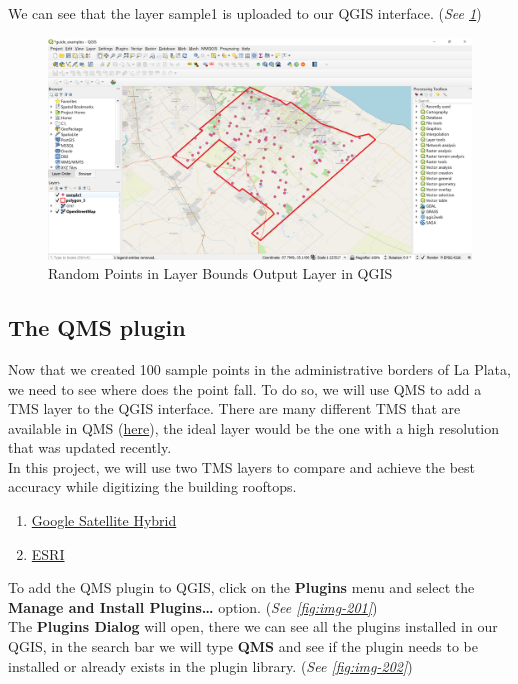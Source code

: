 \documentclass[
]{book}
\providecommand{\tightlist}{%
  \setlength{\itemsep}{0pt}\setlength{\parskip}{0pt}}
\begin{document}
We can see that the layer {sample1} is uploaded to our QGIS interface. (\emph{See \ref{fig:img-200}})

\begin{figure}

{\centering \includegraphics[width=1\linewidth]{images/spatialpoints3} 

}

\caption{Random Points in Layer Bounds Output Layer in QGIS}\label{fig:img-200}
\end{figure}

\hypertarget{the-qms-plugin}{%
\subsection{The QMS plugin}\label{the-qms-plugin}}

Now that we created 100 sample points in the administrative borders of La Plata, we need to see where does the point fall. To do so, we will use QMS to add a TMS layer to the QGIS interface.
There are many different TMS that are available in QMS (\href{https://qms.nextgis.com/\#}{here}), the ideal layer would be the one with a high resolution that was updated recently.\\
In this project, we will use two TMS layers to compare and achieve the best accuracy while digitizing the building rooftops.

\begin{enumerate}
\def\labelenumi{\arabic{enumi}.}
\tightlist
\item
  \href{https://qms.nextgis.com/geoservices/1135/}{Google Satellite Hybrid}
\item
  \href{https://qms.nextgis.com/geoservices/4470/}{ESRI}
\end{enumerate}

To add the QMS plugin to QGIS, click on the \textbf{Plugins} menu and select the \textbf{Manage and Install Plugins\ldots{}} option. (\emph{See \ref{fig:img-201}})\\
The \textbf{Plugins Dialog} will open, there we can see all the plugins installed in our QGIS, in the search bar we will type \textbf{QMS} and see if the plugin needs to be installed or already exists in the plugin library. (\emph{See \ref{fig:img-202}})
\end{document}
